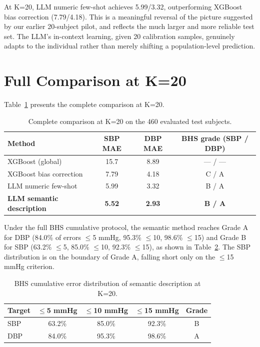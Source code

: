 At K=20, LLM numeric few-shot achieves 5.99/3.32, outperforming XGBoost bias correction (7.79/4.18). This is a meaningful reversal of the picture suggested by our earlier 20-subject pilot, and reflects the much larger and more reliable test set. The LLM's in-context learning, given 20 calibration samples, genuinely adapts to the individual rather than merely shifting a population-level prediction.

\section{Full Comparison at K=20}

Table~\ref{tab:full_comparison} presents the complete comparison at K=20.

\begin{table}[H]
\centering
\begin{tabular}{lccc}
\toprule
Method & SBP MAE & DBP MAE & BHS grade (SBP / DBP) \\
\midrule
XGBoost (global) & 15.7 & 8.89 & --- / --- \\
XGBoost bias correction & 7.79 & 4.18 & C / A \\
LLM numeric few-shot & 5.99 & 3.32 & B / A \\
\textbf{LLM semantic description} & \textbf{5.52} & \textbf{2.93} & \textbf{B / A} \\
\bottomrule
\end{tabular}
\caption{Complete comparison at K=20 on the 460 evaluated test subjects.}
\label{tab:full_comparison}
\end{table}

Under the full BHS cumulative protocol, the semantic method reaches Grade A for DBP (84.0\% of errors $\leq$5 mmHg, 95.3\% $\leq$10, 98.6\% $\leq$15) and Grade B for SBP (63.2\% $\leq$5, 85.0\% $\leq$10, 92.3\% $\leq$15), as shown in Table~\ref{tab:bhs}. The SBP distribution is on the boundary of Grade A, falling short only on the $\leq$15 mmHg criterion.

\begin{table}[H]
\centering
\begin{tabular}{lcccc}
\toprule
Target & $\leq$5 mmHg & $\leq$10 mmHg & $\leq$15 mmHg & Grade \\
\midrule
SBP & 63.2\% & 85.0\% & 92.3\% & B \\
DBP & 84.0\% & 95.3\% & 98.6\% & A \\
\bottomrule
\end{tabular}
\caption{BHS cumulative error distribution of semantic description at K=20.}
\label{tab:bhs}
\end{table}


